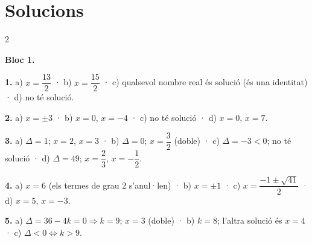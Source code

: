 \documentclass[13pt,a4paper]{extarticle}
\begin{document}
\section*{Solucions}
\small\begin{multicols}{2}

\textbf{Bloc 1.}\par
\par\noindent\begin{minipage}{\linewidth}
\textbf{1.} a) $x=\dfrac{13}{2}$ · b) $x=\dfrac{15}{2}$ · c) qualsevol nombre real és solució (és una identitat) · d) no té solució.\par
\end{minipage}\par\vspace{1.6mm}
\par\noindent\begin{minipage}{\linewidth}
\textbf{2.} a) $x=\pm3$ · b) $x=0$, $x=-4$ · c) no té solució · d) $x=0$, $x=7$.\par
\end{minipage}\par\vspace{1.6mm}
\par\noindent\begin{minipage}{\linewidth}
\textbf{3.} a) $\Delta=1$; $x=2$, $x=3$ · b) $\Delta=0$; $x=\dfrac32$ (doble) · c) $\Delta=-3<0$; no té solució · d) $\Delta=49$; $x=\dfrac23$, $x=-\dfrac12$.\par
\end{minipage}\par\vspace{1.6mm}
\par\noindent\begin{minipage}{\linewidth}
\textbf{4.} a) $x=6$ (els termes de grau 2 s'anul·len) · b) $x=\pm1$ · c) $x=\dfrac{-1\pm\sqrt{41}}{2}$ · d) $x=5$, $x=-3$.\par
\end{minipage}\par\vspace{1.6mm}
\par\noindent\begin{minipage}{\linewidth}
\textbf{5.} a) $\Delta=36-4k=0 \Rightarrow k=9$; $x=3$ (doble) · b) $k=8$; l'altra solució és $x=4$ · c) $\Delta<0 \Leftrightarrow k>9$.\par
\end{minipage}\par\vspace{1.6mm}
\par\noindent\begin{minipage}{\linewidth}

\end{minipage}
\end{multicols}
\end{document}
